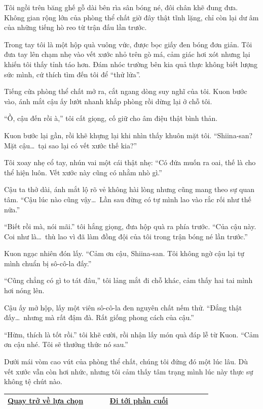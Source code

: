 \documentclass[../main.tex]{subfiles}
\begin{document}
Tôi ngồi trên băng ghế gỗ dài bên rìa sân bóng né, đôi chân khẽ đung đưa. Không gian rộng lớn của phòng thể chất giờ đây thật tĩnh lặng, chỉ còn lại dư âm của những tiếng hò reo từ trận đấu lần trước.

Trong tay tôi là một hộp quà vuông vức, được bọc giấy đen bóng đơn giản. Tôi đưa tay lên chạm nhẹ vào vết xước nhỏ trên gò má, cảm giác hơi xót nhưng lại khiến tôi thấy tỉnh táo hơn. Đám nhóc trường bên kia quả thực không biết lượng sức mình, cứ thích tìm đến tôi để ``thử lửa''.

Tiếng cửa phòng thể chất mở ra, cắt ngang dòng suy nghĩ của tôi. Kuon bước vào, ánh mắt cậu ấy lướt nhanh khắp phòng rồi dừng lại ở chỗ tôi.

``Ồ, cậu đến rồi à,'' tôi cất giọng, cố giữ cho âm điệu thật bình thản.

Kuon bước lại gần, rồi khẽ khựng lại khi nhìn thấy khuôn mặt tôi. ``Shiina-san? Mặt cậu\dots\ tại sao lại có vết xước thế kia?''

Tôi xoay nhẹ cổ tay, nhún vai một cái thật nhẹ: ``Có đứa muốn ra oai, thế là cho thể hiện luôn. Vết xước này cũng có nhằm nhò gì.''

Cậu ta thở dài, ánh mắt lộ rõ vẻ không hài lòng nhưng cũng mang theo sự quan tâm. ``Cậu lúc nào cũng vậy\dots\ Lần sau đừng có tự mình lao vào rắc rối như thế nữa.''

``Biết rồi mà, nói mãi.'' tôi hắng giọng, đưa hộp quà ra phía trước. ``Của cậu này. Coi như là\dots\ thù lao vì đã làm đồng đội của tôi trong trận bóng né lần trước.''

Kuon ngạc nhiên đón lấy. ``Cảm ơn cậu, Shiina-san. Tôi không ngờ cậu lại tự mình chuẩn bị sô-cô-la đấy.''

``Cũng chẳng có gì to tát đâu,'' tôi lảng mắt đi chỗ khác, cảm thấy hai tai mình hơi nóng lên.

Cậu ấy mở hộp, lấy một viên sô-cô-la đen nguyên chất nếm thử. ``Đắng thật đấy\dots\ nhưng mà rất đậm đà. Rất giống phong cách của cậu.''

``Hừm, thích là tốt rồi.'' tôi khẽ cười, rồi nhận lấy món quà đáp lễ từ Kuon. ``Cảm ơn cậu nhé. Tôi sẽ thưởng thức nó sau.''

Dưới mái vòm cao vút của phòng thể chất, chúng tôi đứng đó một lúc lâu. Dù vết xước vẫn còn hơi nhức, nhưng tôi cảm thấy tâm trạng mình lúc này thực sự không tệ chút nào.

\begin{table}[H]
  \centering
  \setlength{\arrayrulewidth}{1pt}
  \begin{tabular}{|>{\centering\arraybackslash}p{0.4\linewidth}|>{\centering\arraybackslash}p{0.4\linewidth}|}
    \hline
    \hyperref[choice]{Quay trở về lựa chọn} & \hyperref[ending]{Đi tới phần cuối} \\ \hline
  \end{tabular}
\end{table}
\end{document}

